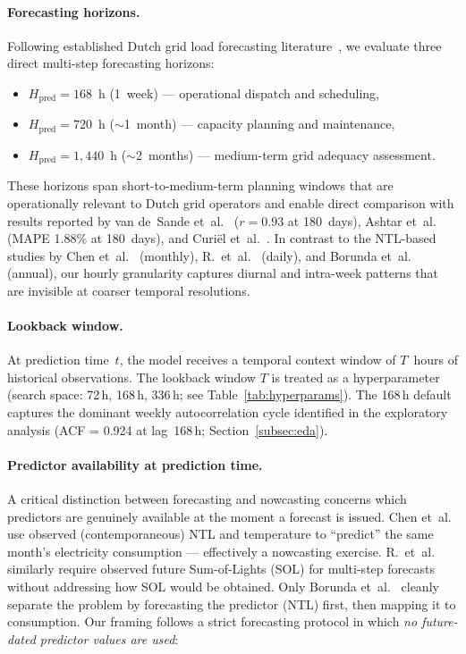 \paragraph{Forecasting horizons.}
Following established Dutch grid load forecasting literature~\cite{curiel_integrating_2025, ashtar_hybrid_2025, van_de_sande_enhancing_2024}, we evaluate three direct multi-step forecasting horizons:
\begin{itemize}
    \item $H_{\text{pred}} = 168$~h (1~week) — operational dispatch and scheduling,
    \item $H_{\text{pred}} = 720$~h ($\sim$1~month) — capacity planning and maintenance,
    \item $H_{\text{pred}} = 1{,}440$~h ($\sim$2~months) — medium-term grid adequacy assessment.
\end{itemize}
These horizons span short-to-medium-term planning windows that are operationally relevant to Dutch grid operators and enable direct comparison with results reported by van de~Sande et~al.~\cite{van_de_sande_enhancing_2024} ($r = 0.93$ at 180~days), Ashtar et~al.~\cite{ashtar_hybrid_2025} (MAPE 1.88\% at 180~days), and Curi\"el et~al.~\cite{curiel_integrating_2025}. In contrast to the NTL-based studies by Chen et~al.~\cite{chen_monthly_2025} (monthly), R.~et~al.~\cite{r_forecasting_2025} (daily), and Borunda et~al.~\cite{borunda_machine_2025} (annual), our hourly granularity captures diurnal and intra-week patterns that are invisible at coarser temporal resolutions.

\paragraph{Lookback window.}
At prediction time~$t$, the model receives a temporal context window of $T$~hours of historical observations. The lookback window $T$ is treated as a hyperparameter (search space: 72\,h, 168\,h, 336\,h; see Table~\ref{tab:hyperparams}). The 168\,h default captures the dominant weekly autocorrelation cycle identified in the exploratory analysis (ACF = 0.924 at lag~168\,h; Section~\ref{subsec:eda}).

\paragraph{Predictor availability at prediction time.}
A critical distinction between forecasting and nowcasting concerns which predictors are genuinely available at the moment a forecast is issued. Chen et~al.~\cite{chen_monthly_2025} use observed (contemporaneous) NTL and temperature to ``predict'' the same month's electricity consumption — effectively a nowcasting exercise. R.~et~al.~\cite{r_forecasting_2025} similarly require observed future Sum-of-Lights (SOL) for multi-step forecasts without addressing how SOL would be obtained. Only Borunda et~al.~\cite{borunda_machine_2025} cleanly separate the problem by forecasting the predictor (NTL) first, then mapping it to consumption. Our framing follows a strict forecasting protocol in which \emph{no future-dated predictor values are used}:

